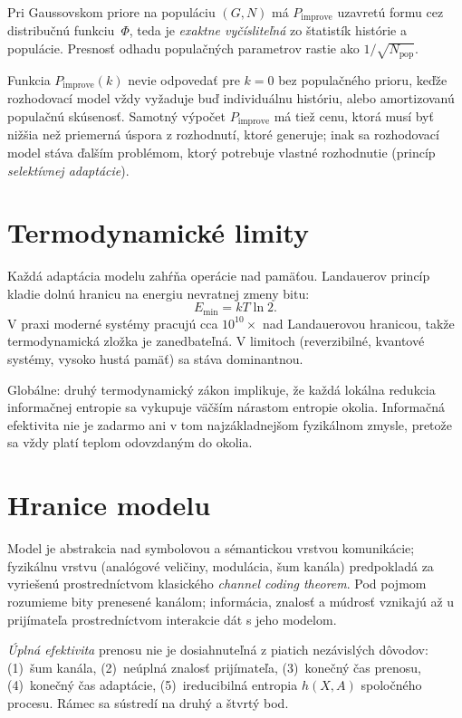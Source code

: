 \documentclass[11pt,a4paper]{article}
\begin{document}
Pri Gaussovskom priore na populáciu $(G, N)$ má $P_{\text{improve}}$
uzavretú formu cez distribučnú funkciu~$\Phi$, teda je \emph{exaktne
vyčísliteľná} zo štatistík histórie a populácie. Presnosť odhadu
populačných parametrov rastie ako $1/\sqrt{N_{\text{pop}}}$.

Funkcia $P_{\text{improve}}(k)$ nevie odpovedať pre $k=0$ bez
populačného prioru, keďže rozhodovací model vždy vyžaduje buď
individuálnu históriu, alebo amortizovanú populačnú skúsenosť.
Samotný výpočet $P_{\text{improve}}$ má tiež cenu, ktorá musí byť
nižšia než priemerná úspora z rozhodnutí, ktoré generuje; inak sa
rozhodovací model stáva ďalším problémom, ktorý potrebuje vlastné
rozhodnutie (princíp \emph{selektívnej adaptácie}).

\section{Termodynamické limity}

Každá adaptácia modelu zahŕňa operácie nad pamäťou. Landauerov
princíp~\cite{landauer1961} kladie dolnú hranicu na energiu
nevratnej zmeny bitu:
\[
    E_{\min} = kT \ln 2.
\]
V praxi moderné systémy pracujú cca $10^{10}\times$ nad Landauerovou
hranicou, takže termodynamická zložka je zanedbateľná. V limitoch
(reverzibilné, kvantové systémy, vysoko hustá pamäť) sa stáva
dominantnou.

Globálne: druhý termodynamický zákon implikuje, že každá lokálna
redukcia informačnej entropie sa vykupuje väčším nárastom entropie
okolia. Informačná efektivita nie je zadarmo ani v tom najzákladnejšom
fyzikálnom zmysle, pretože sa vždy platí teplom odovzdaným do okolia.

\section{Hranice modelu}

Model je abstrakcia nad symbolovou a sémantickou vrstvou komunikácie;
fyzikálnu vrstvu (analógové veličiny, modulácia, šum kanála)
predpokladá za vyriešenú prostredníctvom klasického
\emph{channel coding theorem}. Pod pojmom  rozumieme bity
prenesené kanálom; informácia, znalosť a múdrosť vznikajú až
u prijímateľa prostredníctvom interakcie dát s jeho modelom.

\emph{Úplná efektivita} prenosu nie je dosiahnuteľná z piatich
nezávislých dôvodov: (1)~šum kanála, (2)~neúplná znalosť prijímateľa,
(3)~konečný čas prenosu, (4)~konečný čas adaptácie,
(5)~ireducibilná entropia $h(X,A)$ spoločného procesu. Rámec sa
sústredí na druhý a štvrtý bod.
\end{document}
